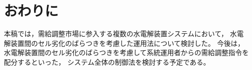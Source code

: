 \documentclass[fleqn]{ieej}
\begin{document}


\vspace{-2mm}

\section{おわりに}\label{sec:conclusion}

\vspace{-2mm}

本稿では，需給調整市場に参入する複数の水電解装置システムにおいて，
水電解装置間のセル劣化のばらつきを考慮した運用法について検討した。
今後は，水電解装置間のセル劣化のばらつきを考慮して系統運用者からの需給調整指令を配分するといった，
システム全体の制御法を検討する予定である。

\end{document}
